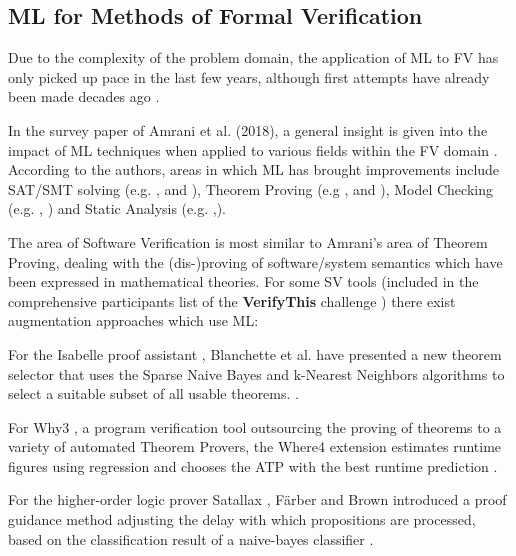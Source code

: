 \documentclass[runningheads,a4paper]{llncs}
\begin{document}
\subsection*{ML for Methods of Formal Verification}

Due to the complexity of the problem domain, the application of ML to FV has only picked up pace in the last few years, although first attempts have already been made decades ago \cite{lounisIntegratingMachinelearningTechniques1993}.

In the survey paper of Amrani et al. (2018), a general insight is given into the impact of ML techniques when applied to various fields within the FV domain \cite{amraniMLFVSurvey2018a}. According to the authors, areas in which ML has brought improvements include SAT/SMT solving (e.g. \cite{DBLP:conf/aaai/SamulowitzM07}, \cite{hutterPerformancePredictionAutomated2006} and \cite{wuImprovingSATsolvingMachine2017}), Theorem Proving (e.g \cite{bridgeMachineLearningFirstOrder2014}, \cite{kuhlweinMaLeSFrameworkAutomatic2015} and \cite{kuhlweinOverviewEvaluationPremise2012}), Model Checking (e.g. \cite{DBLP:conf/mochart/AraragiC06}, \cite{clarkeSATBasedAbstractionRefinement2002}) and Static Analysis (e.g. \cite{yerimaAndroidMalwareDetection2014},\cite{kimClassifyingSoftwareChanges2008}).

The area of Software Verification is most similar to Amrani's area of Theorem Proving, dealing with the (dis-)proving of software/system semantics which have been expressed in mathematical theories. For some SV tools (included in the comprehensive participants list of the \textbf{VerifyThis} challenge \cite{ernstVerifyThisVerificationCompetition2019}) there exist augmentation approaches which use ML:

For the Isabelle proof assistant \cite{technischeuniversitatmunchenIsabelle}, Blanchette et al. have presented a new theorem selector that uses the Sparse Naive Bayes and k-Nearest Neighbors algorithms to select a suitable subset of all usable theorems. \cite{blanchetteLearningBasedFactSelector2016}.

For Why3 \cite{filliatreWhy3WherePrograms2013}, a program verification tool outsourcing the proving of theorems to a variety of automated Theorem Provers, the Where4 extension estimates runtime figures using regression and chooses the ATP with the best runtime prediction \cite{healyPredictingSMTSolver2017}.

For the higher-order logic prover Satallax \cite{brownSatallaxAutomaticHigherOrder2012}, Färber and Brown introduced a proof guidance method adjusting the delay with which propositions are processed, based on the classification result of a naive-bayes classifier \cite{farberInternalGuidanceSatallax2016}.
\end{document}
